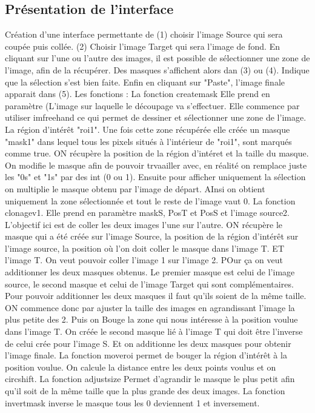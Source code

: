 \subsection{Présentation de l'interface }

Création d'une interface permettante de (1) choisir l'image Source qui sera coupée puis collée. (2) Choisir l'image Target qui sera l'image de fond. En cliquant sur l'une ou l'autre des images, il est possible de sélectionner une zone de l'image, afin de la récupérer. Des masques s'affichent alors dan (3) ou (4). Indique que la sélection s'est bien faite. 
Enfin en cliquant sur "Paste", l'image finale apparait dans (5).
Les fonctions : 
\newline
La fonction createmask 
Elle prend en paramètre (L'image sur laquelle le découpage va s'effectuer.
Elle commence par utiliser imfreehand  ce qui permet de dessiner et sélectionner une zone de l'image. La région d'intérêt "roi1". Une fois cette zone récupérée elle créée un masque "mask1" dans lequel tous les pixels situés à l'intérieur de "roi1", sont marqués comme true. ON récupère la position de la région d'intéret et la taille du masque.
On modifie le masque afin de pouvoir trvaailler avec, en réalité on remplace juste les "0s" et "1s" par des int (0 ou 1). Ensuite pour afficher uniquement la sélection on multiplie le masque obtenu par l'image de départ. AInsi on obtient uniquement la zone sélectionnée et tout le reste de l'image vaut 0. \newline
La fonction clonagev1. Elle prend en paramètre maskS, PosT et PosS et l'image source2. L'objectif ici est de coller les deux images l'une sur l'autre. ON récupère le masque qui a été créée sur l'image Source, la position de la région d'intérêt sur l'image source, la position où l'on doit coller le masque dans l'image T. ET l'image T. 
On veut pouvoir coller l'image 1 sur l'image 2. POur ça on veut additionner les deux masques obtenus. Le premier masque est celui de l'image source, le second masque et celui de l'image Target qui sont complémentaires. 
Pour pouvoir additionner les deux masques il faut qu'ils soient de la même taille. ON commence donc par ajuster la taille des images en agrandissant l'image la plus petite des 2. Puis on Bouge la zone qui nous intéresse à la position voulue dans l'image T. 
On créée le second masque lié à l'image T qui doit être l'inverse de celui crée pour l'image  S. Et on additionne les deux masques pour obtenir l'image finale.
\newline
La fonction moveroi permet de bouger la région d'intérêt à la position voulue. On calcule la distance entre les deux points voulus et on circshift. 
\newline
La fonction adjustsize Permet d'agrandir le masque le plus petit afin qu'il soit de la même taille que la plus grande des deux images.\newline
La fonction invertmask inverse le masque tous les 0 deviennent 1 et inversement. 